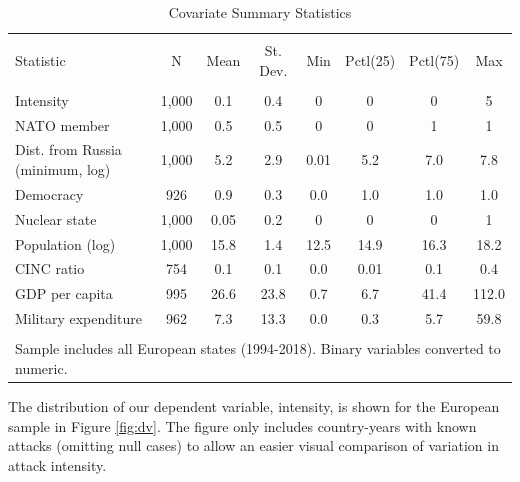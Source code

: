 \documentclass[
]{article}
\begin{document}
\begin{table}[!htbp] \centering 
  \caption{Covariate Summary Statistics} 
  \label{tab:summary-stats} 
\begin{tabular}{@{\extracolsep{5pt}}lccccccc} 
\\[-1.8ex]\hline 
\hline \\[-1.8ex] 
Statistic & \multicolumn{1}{c}{N} & \multicolumn{1}{c}{Mean} & \multicolumn{1}{c}{St. Dev.} & \multicolumn{1}{c}{Min} & \multicolumn{1}{c}{Pctl(25)} & \multicolumn{1}{c}{Pctl(75)} & \multicolumn{1}{c}{Max} \\ 
\hline \\[-1.8ex] 
Intensity & 1,000 & 0.1 & 0.4 & 0 & 0 & 0 & 5 \\ 
NATO member & 1,000 & 0.5 & 0.5 & 0 & 0 & 1 & 1 \\ 
Dist. from Russia (minimum, log) & 1,000 & 5.2 & 2.9 & 0.01 & 5.2 & 7.0 & 7.8 \\ 
Democracy & 926 & 0.9 & 0.3 & 0.0 & 1.0 & 1.0 & 1.0 \\ 
Nuclear state & 1,000 & 0.05 & 0.2 & 0 & 0 & 0 & 1 \\ 
Population (log) & 1,000 & 15.8 & 1.4 & 12.5 & 14.9 & 16.3 & 18.2 \\ 
CINC ratio & 754 & 0.1 & 0.1 & 0.0 & 0.01 & 0.1 & 0.4 \\ 
GDP per capita & 995 & 26.6 & 23.8 & 0.7 & 6.7 & 41.4 & 112.0 \\ 
Military expenditure & 962 & 7.3 & 13.3 & 0.0 & 0.3 & 5.7 & 59.8 \\ 
\hline \\[-1.8ex] 
\multicolumn{8}{l}{Sample includes all European states (1994-2018). Binary variables converted to numeric.} \\ 
\end{tabular} 
\end{table}

The distribution of our dependent variable, intensity, is shown for the European sample in Figure \ref{fig:dv}. The figure only includes country-years with known attacks (omitting null cases) to allow an easier visual comparison of variation in attack intensity.
\end{document}
